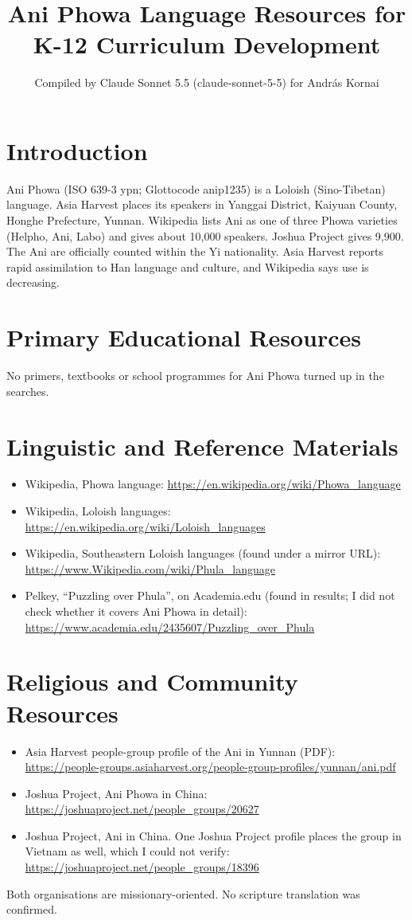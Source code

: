 \documentclass[12pt]{article}
\title{Ani Phowa Language Resources for K-12 Curriculum Development}
\author{Compiled by Claude Sonnet 5.5 (claude-sonnet-5-5) for Andr\'as Kornai}
\date{}
\begin{document}
\maketitle

\section{Introduction}
Ani Phowa (ISO 639-3 ypn; Glottocode anip1235) is a Loloish (Sino-Tibetan) language. Asia Harvest places its speakers in Yanggai District, Kaiyuan County, Honghe Prefecture, Yunnan. Wikipedia lists Ani as one of three Phowa varieties (Helpho, Ani, Labo) and gives about 10,000 speakers. Joshua Project gives 9,900. The Ani are officially counted within the Yi nationality. Asia Harvest reports rapid assimilation to Han language and culture, and Wikipedia says use is decreasing.

\section{Primary Educational Resources}
No primers, textbooks or school programmes for Ani Phowa turned up in the searches.

\section{Linguistic and Reference Materials}
\begin{itemize}
\item Wikipedia, Phowa language: \url{https://en.wikipedia.org/wiki/Phowa_language}
\item Wikipedia, Loloish languages: \url{https://en.wikipedia.org/wiki/Loloish_languages}
\item Wikipedia, Southeastern Loloish languages (found under a mirror URL): \url{https://www.Wikipedia.com/wiki/Phula_language}
\item Pelkey, ``Puzzling over Phula'', on Academia.edu (found in results; I did not check whether it covers Ani Phowa in detail): \url{https://www.academia.edu/2435607/Puzzling_over_Phula}
\end{itemize}

\section{Religious and Community Resources}
\begin{itemize}
\item Asia Harvest people-group profile of the Ani in Yunnan (PDF): \url{https://people-groups.asiaharvest.org/people-group-profiles/yunnan/ani.pdf}
\item Joshua Project, Ani Phowa in China: \url{https://joshuaproject.net/people_groups/20627}
\item Joshua Project, Ani in China. One Joshua Project profile places the group in Vietnam as well, which I could not verify: \url{https://joshuaproject.net/people_groups/18396}
\end{itemize}
Both organisations are missionary-oriented. No scripture translation was confirmed.
\end{document}
